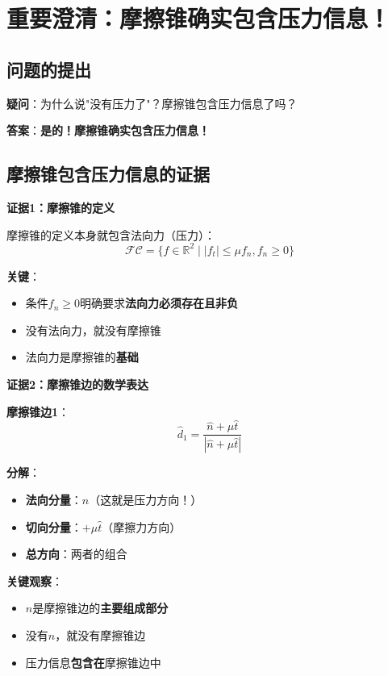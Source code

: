 \documentclass[12pt,a4paper]{article}
\begin{document}
\section{重要澄清：摩擦锥确实包含压力信息！}

\subsection{问题的提出}

\textbf{疑问}：为什么说"没有压力了"？摩擦锥包含压力信息了吗？

\textbf{答案}：\textbf{是的！摩擦锥确实包含压力信息！}

\subsection{摩擦锥包含压力信息的证据}

\textbf{证据1：摩擦锥的定义}

摩擦锥的定义本身就包含法向力（压力）：
\begin{equation}
\mathcal{FC} = \{f \in \mathbb{R}^2 \mid |f_t| \leq \mu f_n, f_n \geq 0\}
\end{equation}

\textbf{关键}：
\begin{itemize}
\item 条件$f_n \geq 0$明确要求\textbf{法向力必须存在且非负}
\item 没有法向力，就没有摩擦锥
\item 法向力是摩擦锥的\textbf{基础}
\end{itemize}

\textbf{证据2：摩擦锥边的数学表达}

\textbf{摩擦锥边1}：
\begin{equation}
\hat{d}_1 = \frac{\hat{n} + \mu \hat{t}}{|\hat{n} + \mu \hat{t}|}
\end{equation}

\textbf{分解}：
\begin{itemize}
\item \textbf{法向分量}：$\hat{n}$（这就是压力方向！）
\item \textbf{切向分量}：$+\mu \hat{t}$（摩擦力方向）
\item \textbf{总方向}：两者的组合
\end{itemize}

\textbf{关键观察}：
\begin{itemize}
\item $\hat{n}$是摩擦锥边的\textbf{主要组成部分}
\item 没有$\hat{n}$，就没有摩擦锥边
\item 压力信息\textbf{包含在}摩擦锥边中
\end{itemize}
\end{document}
